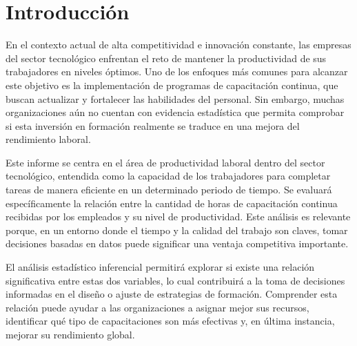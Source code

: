 \vspace*{\fill}

\section{Introducción}

  En el contexto actual de alta competitividad e innovación constante, las empresas del sector tecnológico enfrentan el reto de mantener la productividad de sus trabajadores en niveles óptimos. Uno de los enfoques más comunes para alcanzar este objetivo es la implementación de programas de capacitación continua, que buscan actualizar y fortalecer las habilidades del personal. Sin embargo, muchas organizaciones aún no cuentan con evidencia estadística que permita comprobar si esta inversión en formación realmente se traduce en una mejora del rendimiento laboral.
  
  Este informe se centra en el área de productividad laboral dentro del sector tecnológico, entendida como la capacidad de los trabajadores para completar tareas de manera eficiente en un determinado periodo de tiempo. Se evaluará específicamente la relación entre la cantidad de horas de capacitación continua recibidas por los empleados y su nivel de productividad. Este análisis es relevante porque, en un entorno donde el tiempo y la calidad del trabajo son claves, tomar decisiones basadas en datos puede significar una ventaja competitiva importante.
  
  El análisis estadístico inferencial permitirá explorar si existe una relación significativa entre estas dos variables, lo cual contribuirá a la toma de decisiones informadas en el diseño o ajuste de estrategias de formación. Comprender esta relación puede ayudar a las organizaciones a asignar mejor sus recursos, identificar qué tipo de capacitaciones son más efectivas y, en última instancia, mejorar su rendimiento global.

\vspace*{\fill}